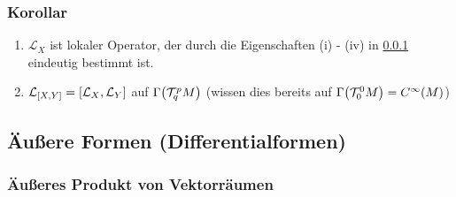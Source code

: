 \subsubsection{Korollar}
\label{ssub:187}
\begin{enumerate}
\item $\mathcal{L}_X$ ist lokaler Operator, der durch die Eigenschaften (i) - (iv) in \ref{ssub:187} eindeutig bestimmt ist.
\item $\mathcal{L}_{[X,Y]} = [\mathcal{L}_X,\mathcal{L}_Y]$ auf $\Gamma\enbrace*{\mathcal{T}_q^p M}$ (wissen dies bereits auf $\Gamma\enbrace*{\mathcal{T}_0^0 M} = C^\infty (M)$)
\end{enumerate}

\subsection{Äußere Formen (Differentialformen)}
\label{sub:111}

\subsubsection{Äußeres Produkt von Vektorräumen}
\label{ssub:188}






\cleardoubleoddemptypage
{}
\setcounter{page}{1}
\printindex
\listoffigures

